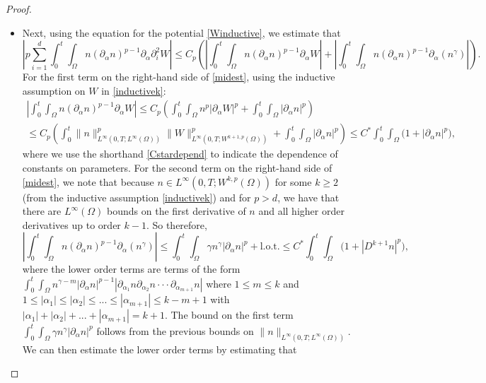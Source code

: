 \documentclass[10pt,a4paper]{amsart}
\begin{document}
\begin{proof}
\begin{itemize}
\begin{equation*}
\end{equation*}
where we recall the shorthand $C^{*}$ from \eqref{Cstardepend}.
\item Next, using the equation for the potential \eqref{Winductive}, we estimate that
\begin{equation}\label{midest}
\left|p\sum_{i = 1}^{d} \int_{0}^{t} \int_{\Omega} n(\partial_{\alpha}n)^{p - 1} \partial_{\alpha}\partial^{2}_{i}W\right| \le C_{p}\left(\left|\int_{0}^{t} \int_{\Omega} n(\partial_{\alpha}n)^{p - 1} \partial_{\alpha} W\right| + \left|\int_{0}^{t} \int_{\Omega} n(\partial_{\alpha}n)^{p - 1} \partial_{\alpha}(n^{\gamma})\right|\right).
\end{equation}
For the first term on the right-hand side of \eqref{midest}, using the inductive assumption on $W$ in \eqref{inductivek}:
\begin{multline*}
\left|\int_{0}^{t} \int_{\Omega} n(\partial_{\alpha} n)^{p - 1} \partial_{\alpha} W\right| \le C_{p}\left(\int_{0}^{t} \int_{\Omega} n^{p} |\partial_{\alpha} W|^{p} + \int_{0}^{t} \int_{\Omega} |\partial_{\alpha}n|^{p}\right) \\
\le C_{p}\left(\int_{0}^{t}\|n\|_{L^{\infty}(0, T; L^{\infty}(\Omega))}^{p} \|W\|_{L^{\infty}(0, T; W^{k + 1, p}(\Omega))}^{p} + \int_{0}^{t} \int_{\Omega} |\partial_{\alpha} n|^{p}\right) \le C^{*}\int_{0}^{t} \int_{\Omega} \Big(1 + |\partial_{\alpha} n|^{p}\Big),
\end{multline*}
where we use the shorthand \eqref{Cstardepend} to indicate the dependence of constants on parameters. For the second term on the right-hand side of \eqref{midest}, we note that because $n \in L^{\infty}(0, T; W^{k, p}(\Omega))$ for some $k \ge 2$ (from the inductive assumption \eqref{inductivek}) and for $p > d$, we have that there are $L^{\infty}(\Omega)$ bounds on the first derivative of $n$ and all higher order derivatives up to order $k - 1$. So therefore,
\begin{equation*}
\left|\int_{0}^{t} \int_{\Omega} n(\partial_{\alpha}n)^{p - 1} \partial_{\alpha}(n^{\gamma})\right| \le \int_{0}^{t} \int_{\Omega} \gamma n^{\gamma} |\partial_{\alpha}n|^{p} + \text{l.o.t.} \le C^{*}\int_{0}^{t} \int_{\Omega} \Big(1 + |D^{k + 1}n|^{p}\Big),
\end{equation*}
where the lower order terms are terms of the form $\displaystyle \int_{0}^{t} \int_{\Omega} n^{\gamma - m} |\partial_{\alpha}n|^{p - 1} |\partial_{\alpha_{1}}n \partial_{\alpha_{2}}n \cdot \cdot \cdot \partial_{\alpha_{m+1}}n|$ where $1 \le m \le k$ and $1 \le |\alpha_{1}| \le |\alpha_{2}| \le ... \le |\alpha_{m+1}| \le k - m + 1$ with $|\alpha_{1}| + |\alpha_{2}| + ... + |\alpha_{m+1}| = k + 1$. The bound on the first term $\displaystyle \int_{0}^{t} \int_{\Omega} \gamma n^{\gamma} |\partial_{\alpha}n|^{p}$ follows from the previous bounds on $\|n\|_{L^{\infty}(0, T; L^{\infty}(\Omega))}$. We can then estimate the lower order terms by estimating that 

\end{itemize}
\end{proof}
\end{document}
